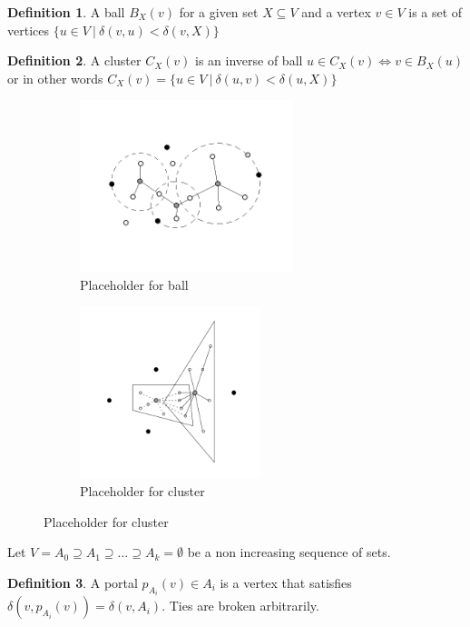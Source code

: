 \documentclass[shortabstract, lic, english]{iithesis}
\theoremstyle{definition} \newtheorem{definition}{Definition}[chapter]
\theoremstyle{remark} \newtheorem{remark}[definition]{Observation}
\theoremstyle{plain} \newtheorem{theorem}[definition]{Theorem}
\theoremstyle{plain} \newtheorem{lemma}[definition]{Lemma}
\theoremstyle{plain} \newtheorem{conjecture}[definition]{Conjecture}
\begin{document}
\begin{definition}
    A ball $B_X(v)$ for a given set $X \subseteq V$ and a vertex $v\in V$
    is a set of vertices $\{u \in V ~|~ \delta(v,u) < \delta(v, X)\}$
\end{definition}

\begin{definition}
    A cluster $C_X(v)$ is an inverse of ball 
    $u\in C_X(v) \iff v\in B_X(u)$ or in other words
    $C_X(v) = \{u \in V ~|~ \delta(u,v) < \delta(u, X)\}$
\end{definition}

\begin{figure}[h]
    \centering
    \begin{subfigure}[h]{0.495\textwidth}
        \centering
        \includegraphics[height=5cm]{images/placeholder_ball}
        \caption{Placeholder for ball}
    \end{subfigure}
    \begin{subfigure}[h]{0.495\textwidth}
        \centering
        \includegraphics[height=5cm]{images/placeholder_cluster}
        \caption{Placeholder for cluster}
    \end{subfigure}
\end{figure}

Let $V = A_0 \supseteq A_1 \supseteq \ldots \supseteq A_k = \emptyset$ be a non increasing 
sequence of sets.

\begin{definition}
    A portal $p_{A_i}(v) \in A_i$ is a vertex that satisfies $\delta(v, p_{A_i}(v)) = \delta(v, A_i)$. Ties are broken arbitrarily. 
\end{definition}
\end{document}
